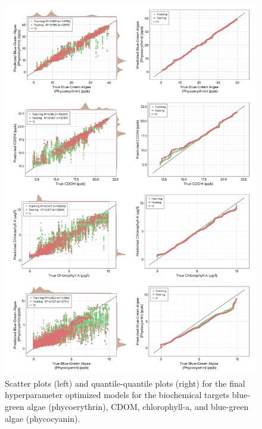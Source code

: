 \documentclass[remotesensing,article,submit,pdftex,moreauthors]{Definitions/mdpi}
\begin{document}
\begin{figure}[t!]
\centering
\vspace{-0.3in}
\includegraphics[width=\columnwidth]{paper/figures/results/fits/biochemical-fitres.png}
\vspace{-0.2in}
\caption{Scatter plots (left) and quantile-quantile plots (right) for the final hyperparameter optimized models for the biochemical targets blue-green algae (phycoerythrin), CDOM, chlorophyll-a, and blue-green algae (phycocyanin). \label{fig:biochem-fit}}
\end{figure}  
\end{document}
